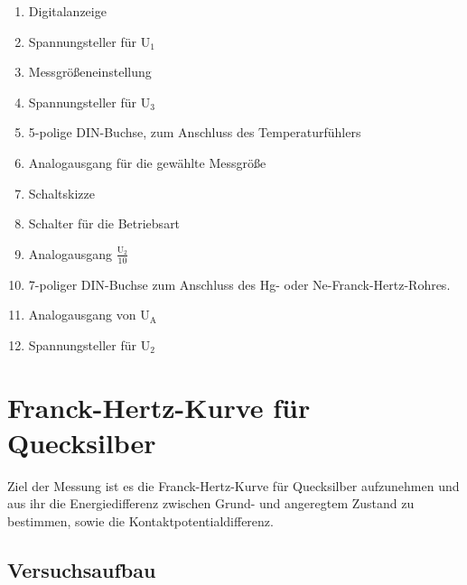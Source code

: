 \documentclass[12pt,a4paper]{article}
\begin{document}
\begin{enumerate}
\item	Digitalanzeige 

\item	Spannungsteller für U$_1$

\item	Messgrößeneinstellung

\item	Spannungsteller für U$_3$

\item	5-polige DIN-Buchse, zum Anschluss des Temperaturfühlers

\item	Analogausgang für die gewählte Messgröße

\item	Schaltskizze 

\item	Schalter für die Betriebsart

\item	Analogausgang $\frac{\text{U}_2}{10}$ 

\item	7-poliger DIN-Buchse zum Anschluss des Hg- oder Ne-Franck-Hertz-Rohres.

\item	Analogausgang von U$_\text{A}$

\item	Spannungsteller für U$_2$
\end{enumerate}

\section{Franck-Hertz-Kurve für Quecksilber}
Ziel der Messung ist es die Franck-Hertz-Kurve für Quecksilber aufzunehmen und aus ihr die Energiedifferenz zwischen Grund- und angeregtem Zustand zu bestimmen, sowie die Kontaktpotentialdifferenz.

\subsection{Versuchsaufbau}
\end{document}
